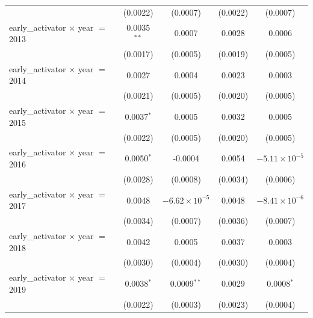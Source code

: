 \begin{tabular}{lcccc}
                                             & (0.0022)           & (0.0007)                  & (0.0022)             & (0.0007)\\   
   early\_activator $\times$ year $=$ 2013   & 0.0035$^{**}$      & 0.0007                    & 0.0028               & 0.0006\\   
                                             & (0.0017)           & (0.0005)                  & (0.0019)             & (0.0005)\\   
   early\_activator $\times$ year $=$ 2014   & 0.0027             & 0.0004                    & 0.0023               & 0.0003\\   
                                             & (0.0021)           & (0.0005)                  & (0.0020)             & (0.0005)\\   
   early\_activator $\times$ year $=$ 2015   & 0.0037$^{*}$       & 0.0005                    & 0.0032               & 0.0005\\   
                                             & (0.0022)           & (0.0005)                  & (0.0020)             & (0.0005)\\   
   early\_activator $\times$ year $=$ 2016   & 0.0050$^{*}$       & -0.0004                   & 0.0054               & $-5.11\times 10^{-5}$\\    
                                             & (0.0028)           & (0.0008)                  & (0.0034)             & (0.0006)\\   
   early\_activator $\times$ year $=$ 2017   & 0.0048             & $-6.62\times 10^{-5}$     & 0.0048               & $-8.41\times 10^{-6}$\\    
                                             & (0.0034)           & (0.0007)                  & (0.0036)             & (0.0007)\\   
   early\_activator $\times$ year $=$ 2018   & 0.0042             & 0.0005                    & 0.0037               & 0.0003\\   
                                             & (0.0030)           & (0.0004)                  & (0.0030)             & (0.0004)\\   
   early\_activator $\times$ year $=$ 2019   & 0.0038$^{*}$       & 0.0009$^{**}$             & 0.0029               & 0.0008$^{*}$\\   
                                             & (0.0022)           & (0.0003)                  & (0.0023)             & (0.0004)\\   

\end{tabular}
